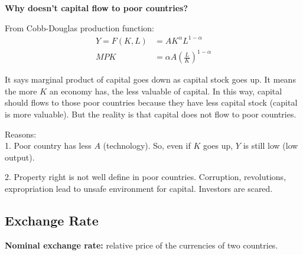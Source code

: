 \documentclass[12pt]{article}
\begin{document}
\begin{figure}[H]
\end{figure}



{\textbf {Why doesn't capital flow to poor countries?}}

From Cobb-Douglas production function:
\begin{align*}
Y = F(K,L) &= AK^{\alpha}L^{1 - \alpha}\\
MPK &= \alpha A \left( \frac{L}{K} \right) ^{1 - \alpha}
\end{align*}

It says marginal product of capital goes down as capital stock goes up.
It means the more $ K $ an economy has, the less valuable of capital.
In this way, capital should flows to those poor countries because they have less
capital stock (capital is more valuable). But the reality is that capital does not
flow to poor countries.

Reasons:\\
1. Poor country has less $ A $ (technology). So, even if $ K $ goes up, $ Y $
is still low (low output).

2. Property right is not well define in poor countries. Corruption, revolutions, 
expropriation lead to unsafe environment for capital. Investors are scared.








\subsection{Exchange Rate}
{\textbf {Nominal exchange rate:}} relative price of the currencies of two countries.
\end{document}
